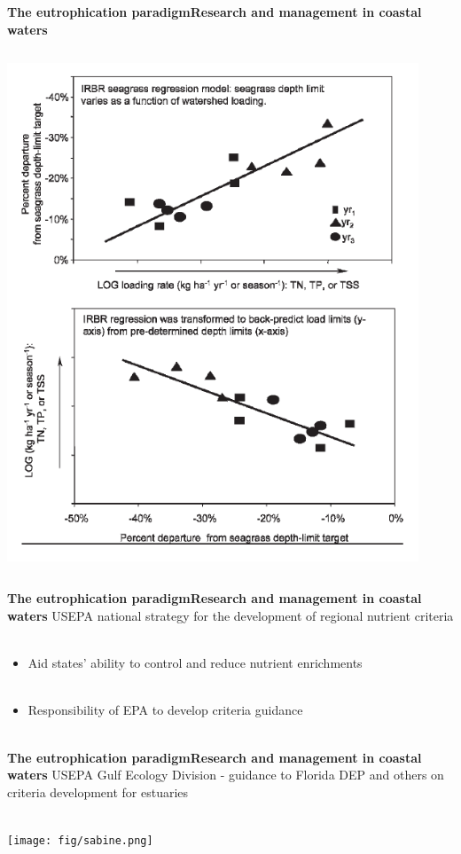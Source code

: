 \documentclass[serif]{beamer}\usepackage[]{graphicx}\usepackage[]{color}
\begin{document}
\begin{frame}{\textbf{The eutrophication paradigm}}{\textbf{Research and management in coastal waters}}
\begin{columns}[T]
\begin{column}{0.45\textwidth}
\centerline{\includegraphics[width = 0.92\textwidth]{fig/irl_reg.png}}
\end{column}
\end{columns}
\end{frame}

\begin{frame}{\textbf{The eutrophication paradigm}}{\textbf{Research and management in coastal waters}}
\onslide<+->
USEPA national strategy for the development of regional nutrient criteria\\~\\
\begin{itemize}
\item Aid states' ability to control and reduce nutrient enrichments \\~\\
\item Responsibility of EPA to develop criteria guidance \\~\\
\end{itemize}
\scriptsize
\hfill \cite{USEPA98}
\end{frame}

\begin{frame}{\textbf{The eutrophication paradigm}}{\textbf{Research and management in coastal waters}}
USEPA Gulf Ecology Division - guidance to Florida DEP and others on criteria development for estuaries \\~\\
\centerline{\texttt{[image: fig/sabine.png]}}
\end{frame}
\end{document}
